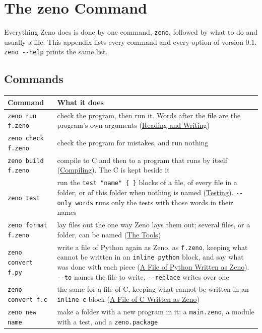 \chapter{The zeno Command}\label{app-commands}

Everything Zeno does is done by one command, \verb|zeno|, followed by
what to do and usually a file. This appendix lists every command and
every option of version 0.1. \verb|zeno --help| prints the same list.

\section{Commands}

\begin{longtable}{lP{8.6cm}}
\toprule
Command & What it does \\
\midrule
\endhead
\verb|zeno run f.zeno| & check the program, then run it. Words after
  the file are the program's own arguments
  (\hyperref[ch-reading-writing]{Reading and Writing}) \\
\verb|zeno check f.zeno| & check the program for mistakes, and run
  nothing \\
\verb|zeno build f.zeno| & compile to C and then to a program that runs
  by itself (\hyperref[ch-compiling]{Compiling}). The C is kept beside
  it \\
\verb|zeno test| & run the \verb|test "name" { }| blocks of a file, of
  every file in a folder, or of this folder when nothing is named
  (\hyperref[ch-testing]{Testing}). \verb|--only words| runs only the
  tests with those words in their names \\
\verb|zeno format f.zeno| & lay files out the one way Zeno lays them
  out; several files, or a folder, can be named
  (\hyperref[ch-tools]{The Tools}) \\
\verb|zeno convert f.py| & write a file of Python again as Zeno, as
  \verb|f.zeno|, keeping what cannot be written in an
  \verb|inline python| block, and say what was done with each piece
  (\hyperref[ch-convert]{A File of Python Written as Zeno}).
  \verb|--to| names the file to write, \verb|--replace| writes over
  one \\
\verb|zeno convert f.c| & the same for a file of C, keeping what
  cannot be written in an \verb|inline c| block
  (\hyperref[ch-convert-c]{A File of C Written as Zeno}) \\
\verb|zeno new name| & make a folder with a new program in it: a
  \verb|main.zeno|, a module with a test, and a \verb|zeno.package|

\end{longtable}
